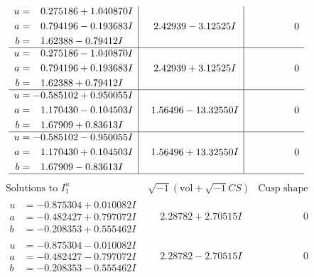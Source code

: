 \documentclass[1p]{elsarticle_modified}
\theoremstyle{definition}
\newcommand{\I}{\sqrt{-1}}
\begin{document}
$$\begin{array}{c|c|c}
\begin{aligned}
u &= \phantom{-}0.275186 + 1.040870 I \\
a &= \phantom{-}0.794196 - 0.193683 I \\
b &= \phantom{-}1.62388 - 0.79412 I\end{aligned}
 & \phantom{-}2.42939 - 3.12525 I & \phantom{-0.000000 } 0 \\ \hline\begin{aligned}
u &= \phantom{-}0.275186 - 1.040870 I \\
a &= \phantom{-}0.794196 + 0.193683 I \\
b &= \phantom{-}1.62388 + 0.79412 I\end{aligned}
 & \phantom{-}2.42939 + 3.12525 I & \phantom{-0.000000 } 0 \\ \hline\begin{aligned}
u &= -0.585102 + 0.950055 I \\
a &= \phantom{-}1.170430 - 0.104503 I \\
b &= \phantom{-}1.67909 + 0.83613 I\end{aligned}
 & \phantom{-}1.56496 - 13.32550 I & \phantom{-0.000000 } 0 \\ \hline\begin{aligned}
u &= -0.585102 - 0.950055 I \\
a &= \phantom{-}1.170430 + 0.104503 I \\
b &= \phantom{-}1.67909 - 0.83613 I\end{aligned}
 & \phantom{-}1.56496 + 13.32550 I & \phantom{-0.000000 } 0\\
 \hline 
 \end{array}$$\newpage$$\begin{array}{c|c|c}  
\text{Solutions to }I^u_{1}& \I (\text{vol} + \sqrt{-1}CS) & \text{Cusp shape}\\
 \hline 
\begin{aligned}
u &= -0.875304 + 0.010082 I \\
a &= -0.482427 + 0.797072 I \\
b &= -0.208353 + 0.555462 I\end{aligned}
 & \phantom{-}2.28782 + 2.70515 I & \phantom{-0.000000 } 0 \\ \hline\begin{aligned}
u &= -0.875304 - 0.010082 I \\
a &= -0.482427 - 0.797072 I \\
b &= -0.208353 - 0.555462 I\end{aligned}
 & \phantom{-}2.28782 - 2.70515 I & \phantom{-0.000000 } 0 \\ \hline\begin{aligned}

\end{aligned}
\end{array}$$
\end{document}
